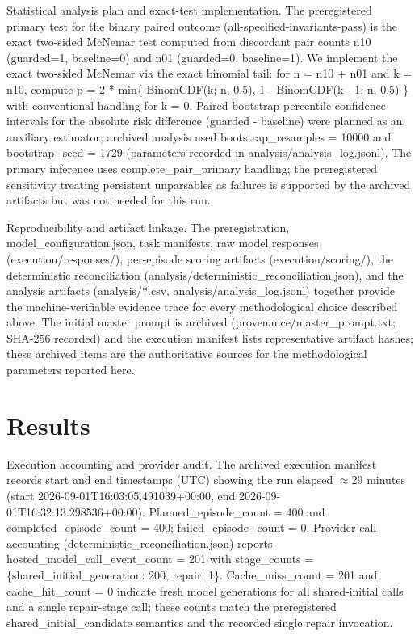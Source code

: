 \documentclass[conference]{IEEEtran}
\begin{document}
Statistical analysis plan and exact-test implementation. The preregistered primary test for the binary paired outcome (all-specified-invariants-pass) is the exact two-sided McNemar test computed from discordant pair counts n10 (guarded=1, baseline=0) and n01 (guarded=0, baseline=1). We implement the exact two-sided McNemar via the exact binomial tail: for n = n10 + n01 and k = n10, compute p = 2 * min\{ BinomCDF(k; n, 0.5), 1 - BinomCDF(k - 1; n, 0.5) \} with conventional handling for k = 0. Paired-bootstrap percentile confidence intervals for the absolute risk difference (guarded - baseline) were planned as an auxiliary estimator; archived analysis used bootstrap\_resamples = 10000 and bootstrap\_seed = 1729 (parameters recorded in analysis/analysis\_log.jsonl). The primary inference uses complete\_pair\_primary handling; the preregistered sensitivity treating persistent unparsables as failures is supported by the archived artifacts but was not needed for this run.

Reproducibility and artifact linkage. The preregistration, model\_configuration.json, task manifests, raw model responses (execution/responses/), per-episode scoring artifacts (execution/scoring/), the deterministic reconciliation (analysis/deterministic\_reconciliation.json), and the analysis artifacts (analysis/*.csv, analysis/analysis\_log.jsonl) together provide the machine-verifiable evidence trace for every methodological choice described above. The initial master prompt is archived (provenance/master\_prompt.txt; SHA-256 recorded) and the execution manifest lists representative artifact hashes; these archived items are the authoritative sources for the methodological parameters reported here.

\section{Results}
Execution accounting and provider audit. The archived execution manifest records start and end timestamps (UTC) showing the run elapsed \ensuremath{\approx}29 minutes (start 2026-09-01T16:03:05.491039+00:00, end 2026-09-01T16:32:13.298536+00:00). Planned\_episode\_count = 400 and completed\_episode\_count = 400; failed\_episode\_count = 0. Provider-call accounting (deterministic\_reconciliation.json) reports hosted\_model\_call\_event\_count = 201 with stage\_counts = \{shared\_initial\_generation: 200, repair: 1\}. Cache\_miss\_count = 201 and cache\_hit\_count = 0 indicate fresh model generations for all shared-initial calls and a single repair-stage call; these counts match the preregistered shared\_initial\_candidate semantics and the recorded single repair invocation.
\end{document}
